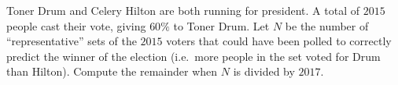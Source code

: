 Toner Drum and Celery Hilton are both running for president. A total of $2015$ people cast their vote, giving $60\%$ to Toner Drum. Let $N$ be the number of ``representative'' sets of the $2015$ voters that could have been polled to correctly predict the winner of the election (i.e.\ more people in the set voted for Drum than Hilton). Compute the remainder when $N$ is divided by $2017$.
